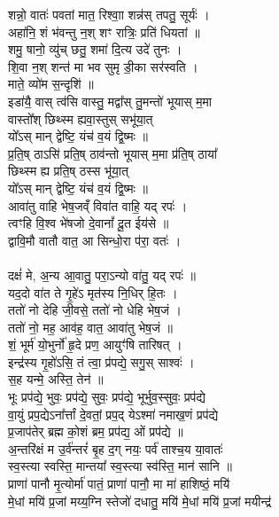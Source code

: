 शन्नो॒ वातः॑ पवतां मात॒ रिश्वाा॒ शन्न॑स् तपतु॒ सूर्यः॑ । \\
अहा॑नि॒ शं भ॑वन्तु न॒श् शꣳ रात्रिः॒ प्रति॑ धियतां ॥\\
शमु॒ षानो॒ व्यु॑च् छतु॒ शमा॑ दि॒त्य उदे॑ तुनः । \\
शि॒वा न॒श् शन्त॑ मा भव सुमृ डी॒का सर॑स्वति ।\\
माते॒ व्यो॑म स॒न्दृशि॑ ॥\\
इडा॑यै॒ वास् त्व॑सि वास्तु॒ मद्वा᳚स् तु॒मन्तो॑ भूयास् म॒मा \\
वास्तो᳚श् छिथ्स्म ह्यवा॒स्तुस् सभू॑या॒त्\\
यो᳚ऽस् मान् द्वेष्टि॒ यंच॑ व॒यं द्वि॒ष्मः ॥\\
प्र॒ति॒ष् ठाऽसि॑ प्रति॒ष् ठाव॑न्तो भूयास् म॒मा प्र॑ति॒ष् ठाया᳚\\
छिथ्स्म ह्य प्रति॒ष् ठस्स भू॑या॒त् \\
यो᳚ऽस् मान् द्वेष्टि॒ यंच॑ व॒यं द्वि॒ष्मः ॥\\
आवा॑तु वाहि भेष॒जव्ँ विवा॑त वाहि॒ यद् रपः॑ ।\\
त्वꣳहि वि॒श्व भे॑षजो दे॒वानां᳚ दू॒त ईय॑से ॥\\
द्वावि॒मौ वातौ वात॒ आ सिन्धो॒रा प॑रा॒ वतः॑ । \\
\\
दक्षं॑ मे, अ॒न्य आ॒वातु॒ परा॒ऽन्यो वा॑तु॒ यद् रपः॑ ॥\\
यद॒दो वा॑त ते गृ॒हे॑ऽ मृत॑स्य नि॒धिर् हि॒तः । \\
ततो॑ नो देहि जी॒वसे॒ ततो॑ नो धेहि भेष॒जं ।\\
ततो॑ नो॒ मह॒ आव॑ह॒ वात॒ आवा॑तु भेष॒जं ॥\\
शं॒ भूर्म॑ यो॒भुर्नो॑ हृ॒दे प्रण॒ आयुꣳ॑षि तारिषत् । \\
इन्द्र॑स्य गृ॒हो॑ऽसि॒ तं त्वा॒ प्र॑पद्ये॒ सगु॒स् साश्वः॑ ।\\
स॒ह यन्मे॒ अस्ति॒ तेन॑ ॥\\
भूः प्रप॑द्ये॒ भुवः॒ प्रप॑द्ये॒ सुवः॒ प्रप॑द्ये॒ भूर्भुव॒स्सुवः॒ प्रप॑द्ये\\
वा॒युं प्रप॒द्येऽना᳚र्त्तां दे॒वतां॒ प्रप॒द् येऽश्मा॑ नमाख॒णं प्रप॑द्ये \\
प्र॒जाप॑तेर् ब्रह्म को॒शं ब्रम॒ प्रप॑द्य॒ ओं प्रप॑द्ये ॥\\
अ॒न्तरि॑क्षं म उ॒र्व॑न्तरं॑ बृ॒ह द॒ग् नयः॒ पर्व॑ ताश्च॒य या॒वातः॑ \\
स्व॒स्त्या स्वस्ति॒ मान्तया᳚ स्व॒स्त्या स्व॑स्ति॒ मान॑ सानि ॥\\
प्राणा॑ पानौ मृ॒त्योर्मा॑ पातं॒ प्राणा॑ पानौ॒ मा मा॑ हाशिष्ठं॒ मयि॑ \\
मे॒धां मयि॑ प्र॒जां मय्य॒ग्नि स्तेजो॑ दधातु॒ मयि॑ मे॒धां मयि॑ प्र॒जां मयीन्द्र॑ \\
